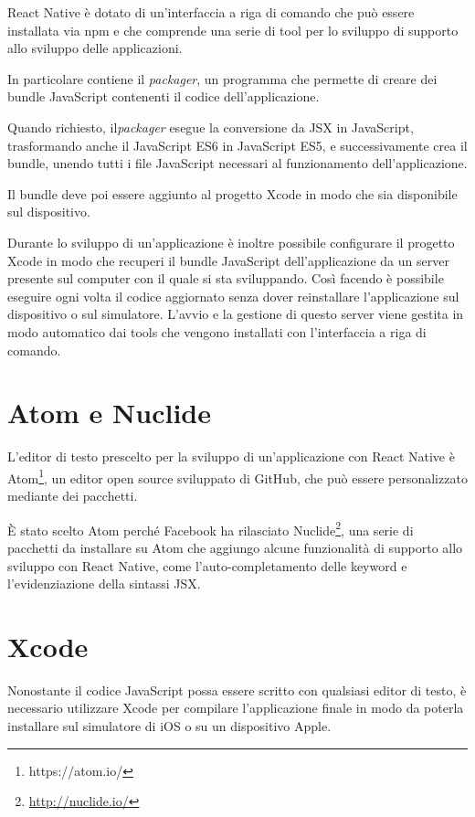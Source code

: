 React Native è dotato di un'interfaccia a riga di comando che può essere installata via npm e che comprende una serie di tool per lo sviluppo di supporto allo sviluppo delle applicazioni.

In particolare contiene il \textit{packager}, un programma che permette di creare dei bundle JavaScript contenenti il codice dell'applicazione.

Quando richiesto, il\textit{packager} esegue la conversione da JSX in JavaScript, trasformando anche il JavaScript ES6 in JavaScript ES5, e successivamente crea il bundle, unendo tutti i file JavaScript necessari al funzionamento dell'applicazione.

Il bundle deve poi essere aggiunto al progetto Xcode in modo che sia disponibile sul dispositivo.

Durante lo sviluppo di un'applicazione è inoltre possibile configurare il progetto Xcode in modo che recuperi il bundle JavaScript dell'applicazione da un server presente sul computer con il quale si sta sviluppando.
Così facendo è possibile eseguire ogni volta il codice aggiornato senza dover reinstallare l'applicazione sul dispositivo o sul simulatore.
L'avvio e la gestione di questo server viene gestita in modo automatico dai tools che vengono installati con l'interfaccia a riga di comando.

\section{Atom e Nuclide}

L'editor di testo prescelto per la sviluppo di un'applicazione con React Native è Atom\footnote{https://atom.io/}, un editor open source sviluppato di GitHub, che può essere personalizzato mediante dei pacchetti.

\`E stato scelto Atom perché Facebook ha rilasciato Nuclide\footnote{\url{http://nuclide.io/}}, una serie di pacchetti da installare su Atom che aggiungo alcune funzionalità di supporto allo sviluppo con React Native, come l'auto-completamento delle keyword e l'evidenziazione della sintassi JSX.

\section{Xcode}

Nonostante il codice JavaScript possa essere scritto con qualsiasi editor di testo, è necessario utilizzare Xcode per compilare l'applicazione finale in modo da poterla installare sul simulatore di iOS o su un dispositivo Apple.

